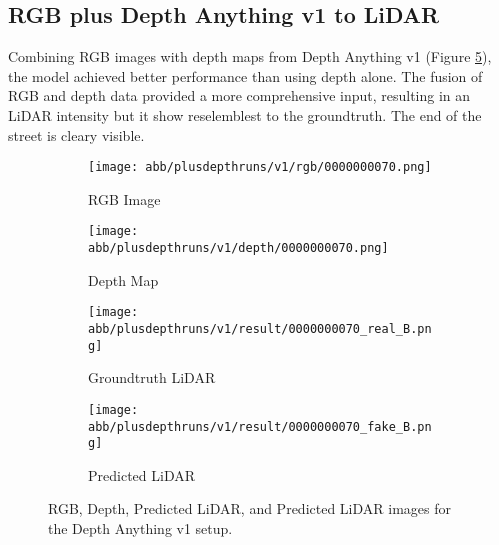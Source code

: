 \subsection{RGB plus Depth Anything v1 to LiDAR}
Combining RGB images with depth maps from Depth Anything v1 (Figure \ref{v1_rgbd}), the model achieved better performance than using depth alone. The fusion of RGB and depth data provided a more comprehensive input, resulting in an LiDAR intensity but it show  reselemblest to the groundtruth. The end of the street is cleary visible.
\begin{figure}[!ht]
	\centering
	\begin{subfigure}{0.4\textwidth}
		\centering
		\texttt{[image: abb/plusdepthruns/v1/rgb/0000000070.png]}
		\caption{RGB Image}
		\label{fig:v1_rgb}
	\end{subfigure}
	
	\vspace{1em} %
	
	\begin{subfigure}{0.4\textwidth}
		\centering
		\texttt{[image: abb/plusdepthruns/v1/depth/0000000070.png]}
		\caption{Depth Map}
		\label{fig:v1_depth}
	\end{subfigure}
	
	\vspace{1em} %
	
	\begin{subfigure}{0.25\textwidth}
		\centering
		\texttt{[image: abb/plusdepthruns/v1/result/0000000070\_real\_B.png]}
		\caption{Groundtruth LiDAR}
		\label{fig:v1_pred_lidar}
	\end{subfigure}
	\begin{subfigure}{0.25\textwidth}
		\centering
		\texttt{[image: abb/plusdepthruns/v1/result/0000000070\_fake\_B.png]}
		\caption{Predicted LiDAR}
		\label{fig:v1_fake_lidar}
	\end{subfigure}
	
	\caption{RGB, Depth, Predicted LiDAR, and Predicted LiDAR images for the Depth Anything v1 setup.}
	\label{v1_rgbd}
\end{figure}
\newpage
